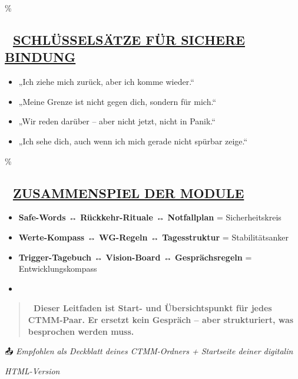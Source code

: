 \hypertarget{schluxfcsselsuxe4tze-fuxfcr-sichere-bindung}{\%
\subsection{\texorpdfstring{\textbf{💬 \ul{SCHLÜSSELSÄTZE FÜR SICHERE BINDUNG}}}{💬 SCHLÜSSELSÄTZE FÜR SICHERE BINDUNG}}\label{schluxfcsselsuxe4tze-fuxfcr-sichere-bindung}}

\begin{itemize}
\tightlist
\item
  „Ich ziehe mich zurück, aber ich komme wieder.``
\item
  „Meine Grenze ist nicht gegen dich, sondern für mich.``
\item
  „Wir reden darüber -- aber nicht jetzt, nicht in Panik.``
\item
  „Ich sehe dich, auch wenn ich mich gerade nicht spürbar zeige.``
\end{itemize}

\hypertarget{zusammenspiel-der-module}{\%
\subsection{\texorpdfstring{\textbf{🔗 \ul{ZUSAMMENSPIEL DER MODULE}}}{🔗 ZUSAMMENSPIEL DER MODULE}}\label{zusammenspiel-der-module}}

\begin{itemize}
\tightlist
\item
  \textbf{Safe-Words ↔ Rückkehr-Rituale ↔ Notfallplan} = Sicherheitskreis
\item
  \textbf{Werte-Kompass ↔ WG-Regeln ↔ Tagesstruktur} = Stabilitätsanker
\item
  \textbf{Trigger-Tagebuch ↔ Vision-Board ↔ Gesprächsregeln} = Entwicklungskompass
\item
\end{itemize}

\begin{quote}
\textbf{📎 Dieser Leitfaden ist Start- und Übersichtspunkt für jedes CTMM-Paar. Er ersetzt kein Gespräch -- aber strukturiert, was besprochen werden muss.}
\end{quote}

📤 \emph{Empfohlen als Deckblatt deines CTMM-Ordners + Startseite deiner digitalin}

\emph{HTML-Version}

